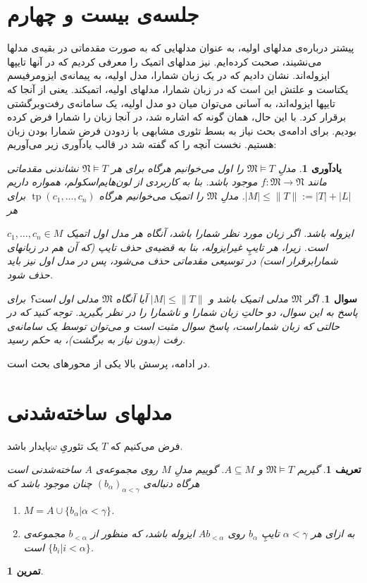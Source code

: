 \documentclass[12pt,a4paper]{report}
\theoremstyle{colorhead}
\newtheorem{tam}[thm]{تمرین}
\newtheorem{defn}[thm]{تعریف}
\newtheorem{yad}[thm]{یادآوری}
\newtheorem{soal}[thm]{سوال}
\DeclareMathOperator{\tp}{tp}
\begin{document}
\section{جلسه‌ی بیست و چهارم}
پیشتر درباره‌ی مدلهای اولیه، به عنوان مدلهایی که به صورت مقدماتی در بقیه‌ی مدلها می‌نشیند، صحبت کرده‌ایم. 
نیز مدلهای اتمیک را معرفی کردیم که در آنها تایپها ایزوله‌اند.  نشان دادیم که در یک زبان شمارا، مدل اولیه، به پیمانه‌ی
ایزومرفیسم یکتاست و علتش این است که در زبان شمارا، مدلهای اولیه، اتمیکند. یعنی از آنجا که تایپها ایزوله‌اند، به آسانی 
می‌توان میان دو مدل اولیه، یک سامانه‌ی رفت‌‌وبرگشتی برقرار کرد. با این حال، همان گونه که اشاره شد، 
در آنجا زبان را شمارا فرض کرده‌ بودیم. 
برای ادامه‌ی بحث نیاز به بسط تئوری مشابهی با زدودن فرضِ شمارا بودن زبان هستیم.
 نخست آنچه را که گفته شد
در قالب یادآوری زیر می‌آوریم:
\begin{yad}
	مدلِ
	$\mathfrak{M}\models T$
	را اول می‌خوانیم هرگاه  برای هر
	$\mathfrak{N}\models T$
	نشاندنی مقدماتی مانند
	$f:\mathfrak{M}\to \mathfrak{N}$
	موجود باشد. بنا به کاربردی از لون‌هایم‌اسکولم، همواره داریم
	$|M|\leq \|T\|:=|T|+|L|$.
	مدلِ
	$\mathfrak{M}$
	را اتمیک می‌خوانیم هرگاه
	$\tp(c_1,\ldots,c_n)$
	برای هر

	$c_1,\ldots,c_n\in M$
ایزوله باشد. اگر زبان مورد نظر شمارا باشد، آنگاه هر مدل اول اتمیک است. زیرا، هر تایپِ غیرایزوله، بنا به قضیه‌ی حذف تایپ (که آن هم در زبانهای شمارابرقرار است) در توسیعی مقدماتی حذف می‌شود، پس در مدل اول نیز باید حذف شود.	
	\end{yad}
\begin{soal}
	اگر
	$\mathfrak{M}$
	مدلی اتمیک باشد و 
	$|M|\leq \|T\|$
	آیا آنگاه
	$\mathfrak{M}$
	مدلی اول است؟ برای پاسخ به این سوال، دو حالتِ زبان شمارا و ناشمارا را در نظر بگیرید. توجه کنید که
	در حالتی که زبان شماراست، پاسخ سوال مثبت است و می‌توان توسط یک سامانه‌ی رفت (بدون نیاز به برگشت)، به حکم رسید.
	\end{soal}
در ادامه، پرسش بالا یکی از محورهای بحث است. 
\section{مدلهای ساخته‌شدنی}
فرض می‌کنیم که 
$T$
یک تئوریِ
$\omega$پایدار
باشد.
\begin{defn}
	گیریم
	$\mathfrak{M}\models T$
	و
	$A\subseteq M$.
	گوییم
	مدلِ
	$M$
	روی مجموعه‌ی
	$A$
	ساخته‌شدنی است هرگاه دنباله‌ی
	$(b_\alpha)_{\alpha<\gamma}$
	چنان موجود باشد که
	\begin{enumerate}
		\item 
		$M=A\cup \{b_\alpha|\alpha<\gamma\}$.
		\item 
		به ازای هر
		$\alpha<\gamma$
		تایپِ
		$b_\alpha$
		روی
		$Ab_{<\alpha}$
		ایزوله باشد، که منظور از
	$b_{<\alpha}$
	مجموعه‌ی
	$\{b_i|i<\alpha\}$
	است. 
	\end{enumerate}
	\end{defn}
\begin{tam}
	\end{tam}
	
\end{document}
